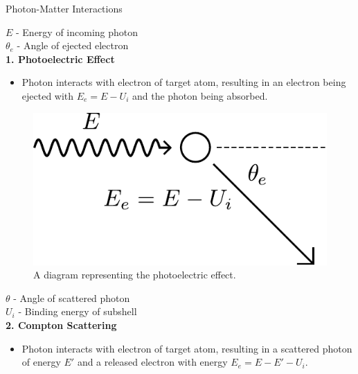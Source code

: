 \documentclass[final]{beamer}
\newlength{\colwidth}
\begin{document}
\begin{frame}[t]
\begin{columns}[t]
\begin{column}{\colwidth}
\begin{block}{Photon-Matter Interactions}
    \begin{multicols}{2}
      \begin{center}
        $E$ - Energy of incoming photon\\
        $\theta_e$ - Angle of ejected electron\\
        \vspace{\baselineskip}
        \textbf{1. Photoelectric Effect}
      \begin{itemize}
        \item Photon interacts with electron of target atom, resulting in an electron being ejected with $E_e = E - U_i$ and the photon being absorbed.
      \end{itemize}
      \end{center}
      \vfill
      \begin{figure}
        \includegraphics[width = 0.4\colwidth]{photoelectric_diagram.pdf}
        \caption{A diagram representing the photoelectric effect.}
      \end{figure}
      \columnbreak%
      \begin{center}
        $\theta$ - Angle of scattered photon \\
        $U_i$ - Binding energy of subshell\\
        \vspace{\baselineskip}
        \textbf{2. Compton Scattering}
      \begin{itemize}
        \item Photon interacts with electron of target atom, resulting in a scattered photon of energy $E'$ and a released electron with energy $E_e = E - E' - U_i$.
      \end{itemize}
      \end{center}
      \begin{figure}

\end{figure}
\end{multicols}
\end{block}
\end{column}
\end{columns}
\end{frame}
\end{document}
